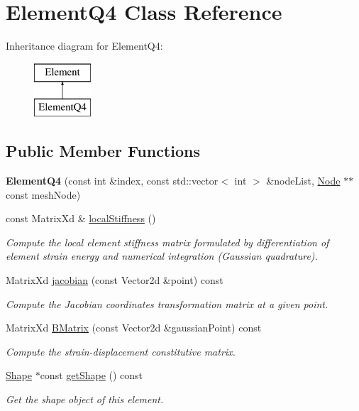 \hypertarget{class_element_q4}{}\section{Element\+Q4 Class Reference}
\label{class_element_q4}
Inheritance diagram for Element\+Q4\+:\begin{figure}[H]
\begin{center}
\leavevmode
\includegraphics[height=2.000000cm]{class_element_q4}
\end{center}
\end{figure}
\subsection*{Public Member Functions}
\begin{DoxyCompactItemize}
\item 
\mbox{\label{class_element_q4_ab119a15023a7abb356d5db5961e2febb}} 
{\bfseries Element\+Q4} (const int \&index, const std\+::vector$<$ int $>$ \&node\+List, \mbox{\hyperlink{class_node}{Node}} $\ast$$\ast$const mesh\+Node)
\item 
const Matrix\+Xd \& \mbox{\hyperlink{class_element_q4_a9a127fdfd6f80efe3c35f20d7b1296cf}{local\+Stiffness}} ()
\begin{DoxyCompactList}\small\item\em Compute the local element stiffness matrix formulated by differentiation of element strain energy and numerical integration (Gaussian quadrature). \end{DoxyCompactList}\item 
Matrix\+Xd \mbox{\hyperlink{class_element_q4_a1347c3ce4ef1c34a16aa72fdf593932d}{jacobian}} (const Vector2d \&point) const
\begin{DoxyCompactList}\small\item\em Compute the Jacobian coordinates transformation matrix at a given point. \end{DoxyCompactList}\item 
Matrix\+Xd \mbox{\hyperlink{class_element_q4_a092a9584a1b3b22cd929246ba100f91a}{B\+Matrix}} (const Vector2d \&gaussian\+Point) const
\begin{DoxyCompactList}\small\item\em Compute the strain-\/displacement constitutive matrix. \end{DoxyCompactList}\item 
\mbox{\hyperlink{class_shape}{Shape}} $\ast$const \mbox{\hyperlink{class_element_q4_a3e2b762e838f20a10c184f55d3d4ff85}{get\+Shape}} () const
\begin{DoxyCompactList}\small\item\em Get the shape object of this element. \end{DoxyCompactList}\end{DoxyCompactItemize}

